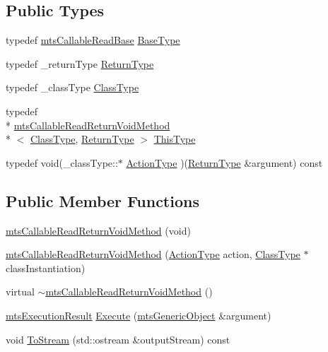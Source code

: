 \subsection*{Public Types}
\begin{DoxyCompactItemize}
\item 
typedef \hyperlink{classmts_callable_read_base}{mts\-Callable\-Read\-Base} \hyperlink{classmts_callable_read_return_void_method_a9dbeaf2b51dba8323c5672945801307c}{Base\-Type}
\item 
typedef \-\_\-return\-Type \hyperlink{classmts_callable_read_return_void_method_a7a7034303bbcaa112a28d75dd0a576d2}{Return\-Type}
\item 
typedef \-\_\-class\-Type \hyperlink{classmts_callable_read_return_void_method_a694e26a4c7fc28f0c739aa2f2ab97e12}{Class\-Type}
\item 
typedef \\*
\hyperlink{classmts_callable_read_return_void_method}{mts\-Callable\-Read\-Return\-Void\-Method}\\*
$<$ \hyperlink{classmts_callable_read_return_void_method_a694e26a4c7fc28f0c739aa2f2ab97e12}{Class\-Type}, \hyperlink{classmts_callable_read_return_void_method_a7a7034303bbcaa112a28d75dd0a576d2}{Return\-Type} $>$ \hyperlink{classmts_callable_read_return_void_method_a118254e466e472246199228424a10737}{This\-Type}
\item 
typedef void(\-\_\-class\-Type\-::$\ast$ \hyperlink{classmts_callable_read_return_void_method_a7f3934dc425501d4af892248c4930525}{Action\-Type} )(\hyperlink{classmts_callable_read_return_void_method_a7a7034303bbcaa112a28d75dd0a576d2}{Return\-Type} \&argument) const 
\end{DoxyCompactItemize}
\subsection*{Public Member Functions}
\begin{DoxyCompactItemize}
\item 
\hyperlink{classmts_callable_read_return_void_method_a80d3ca3aaf921033aa3f14dd6a366877}{mts\-Callable\-Read\-Return\-Void\-Method} (void)
\item 
\hyperlink{classmts_callable_read_return_void_method_aeafc533326dd26e92a87d16bea066205}{mts\-Callable\-Read\-Return\-Void\-Method} (\hyperlink{classmts_callable_read_return_void_method_a7f3934dc425501d4af892248c4930525}{Action\-Type} action, \hyperlink{classmts_callable_read_return_void_method_a694e26a4c7fc28f0c739aa2f2ab97e12}{Class\-Type} $\ast$class\-Instantiation)
\item 
virtual \hyperlink{classmts_callable_read_return_void_method_a55a3d639bf248372bf6ab44663020236}{$\sim$mts\-Callable\-Read\-Return\-Void\-Method} ()
\item 
\hyperlink{classmts_execution_result}{mts\-Execution\-Result} \hyperlink{classmts_callable_read_return_void_method_a79de3217cc169c8d1a47e57234c6481b}{Execute} (\hyperlink{classmts_generic_object}{mts\-Generic\-Object} \&argument)
\item 
void \hyperlink{classmts_callable_read_return_void_method_a27a38456119252878ace309de008be50}{To\-Stream} (std\-::ostream \&output\-Stream) const 
\end{DoxyCompactItemize}
